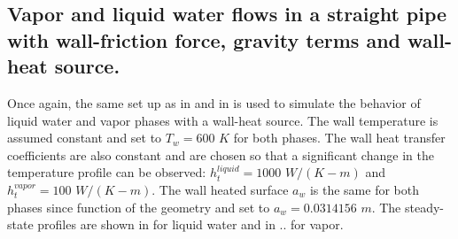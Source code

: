 \subsection{Vapor and liquid water flows in a straight pipe with wall-friction force, gravity terms and wall-heat source.} \label{sec:1d-wall-heat-source}
Once again, the same set up as in  and in  is used to simulate the behavior of liquid water and vapor phases with a wall-heat source. The wall temperature is assumed constant and set to $T_w=600$ $K$ for both phases. The wall heat transfer coefficients are also constant and are chosen so that a significant change in the temperature profile can be observed: $h_t^{liquid} = 1000$ $W/(K-m)$ and $h_t^{vapor} = 100$ $W/(K-m)$. The wall heated surface $a_w$ is the same for both phases since function of the geometry and set to $a_w = 0.0314156$ $m$. The steady-state profiles are shown in for liquid water and in .. for vapor. 

